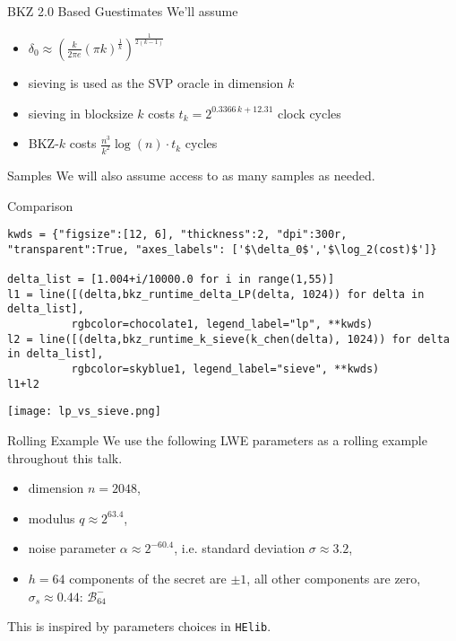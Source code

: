 \documentclass[presentation,smaller]{beamer}
\renewcommand{\B}[2][]{\ensuremath{\mathcal{B}_{#1}^{#2}}\xspace}
\begin{document}
\begin{frame}[label={sec:org3c7ca65}]{BKZ 2.0 Based Guestimates}
We’ll assume 

\begin{itemize}
\item \(δ_0 ≈ {\left( \frac{k}{2 \pi e} {(π k)}^{\frac{1}{k}}  \right)}^{\frac{1}{2(k-1)}}\)
\item sieving is used as the SVP oracle in dimension \(k\)
\item sieving in blocksize \(k\) costs \(t_k = 2^{0.3366\,k + 12.31}\) clock cycles
\item BKZ-\(k\) costs \(\frac{n^3}{k^2} \log(n) \cdot t_k\) cycles
\end{itemize}

\begin{block}{Samples}
We will also assume access to as many samples as needed.
\end{block}
\end{frame}

\begin{frame}[fragile,label={sec:orge198556}]{Comparison}
 \lstset{language=sage,label= ,caption= ,captionpos=b,numbers=none}
\begin{lstlisting}
kwds = {"figsize":[12, 6], "thickness":2, "dpi":300r, "transparent":True, "axes_labels": ['$\delta_0$','$\log_2(cost)$']}

delta_list = [1.004+i/10000.0 for i in range(1,55)]
l1 = line([(delta,bkz_runtime_delta_LP(delta, 1024)) for delta in delta_list],
          rgbcolor=chocolate1, legend_label="lp", **kwds)
l2 = line([(delta,bkz_runtime_k_sieve(k_chen(delta), 1024)) for delta in delta_list], 
          rgbcolor=skyblue1, legend_label="sieve", **kwds)
l1+l2
\end{lstlisting}

\begin{center}
\texttt{[image: lp\_vs\_sieve.png]}
\end{center}
\end{frame}


\begin{frame}[fragile,label={sec:org2d129c7}]{Rolling Example}
 We use the following LWE parameters as a rolling example throughout this talk.

\begin{itemize}
\item dimension \(n=2048\),
\item modulus \(q ≈ 2^{63.4}\),
\item noise parameter \(\alpha ≈ 2^{-60.4}\), i.e. standard deviation \(σ ≈ 3.2\),
\item \(h=64\) components of the secret are \(\pm 1\), all other components are zero, \(σ_s ≈ 0.44\): \(\B[64]{-}\)
\end{itemize}

This is inspired by parameters choices in \texttt{HElib}.
\end{frame}
\end{document}
